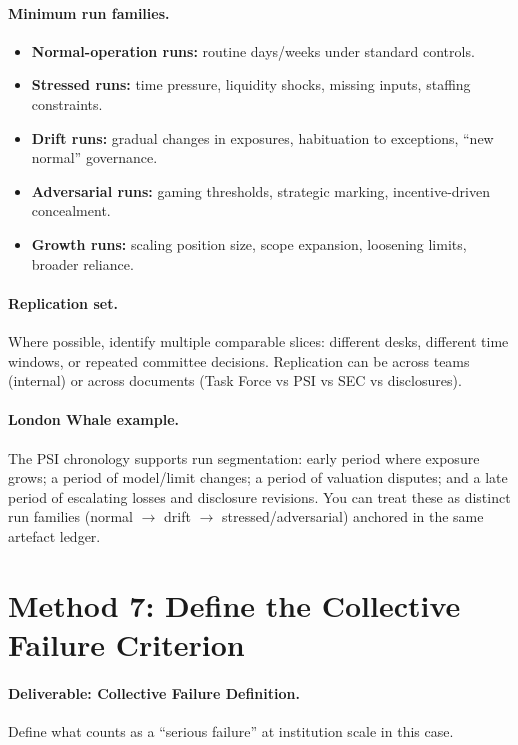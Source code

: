\paragraph{Minimum run families.}
\begin{itemize}
  \item \textbf{Normal-operation runs:} routine days/weeks under standard controls.
  \item \textbf{Stressed runs:} time pressure, liquidity shocks, missing inputs, staffing constraints.
  \item \textbf{Drift runs:} gradual changes in exposures, habituation to exceptions, “new normal” governance.
  \item \textbf{Adversarial runs:} gaming thresholds, strategic marking, incentive-driven concealment.
  \item \textbf{Growth runs:} scaling position size, scope expansion, loosening limits, broader reliance.
\end{itemize}

\paragraph{Replication set.}
Where possible, identify multiple comparable slices: different desks, different time windows, or repeated committee decisions.
Replication can be across teams (internal) or across documents (Task Force vs PSI vs SEC vs disclosures).

\paragraph{London Whale example.}
The PSI chronology supports run segmentation: early period where exposure grows; a period of model/limit changes;
a period of valuation disputes; and a late period of escalating losses and disclosure revisions.
You can treat these as distinct run families (normal $\rightarrow$ drift $\rightarrow$ stressed/adversarial) anchored in the same artefact ledger.

\section{Method 7: Define the Collective Failure Criterion}
\label{sec:m7-failure}

\paragraph{Deliverable: Collective Failure Definition.}
Define what counts as a “serious failure” at institution scale in this case.

